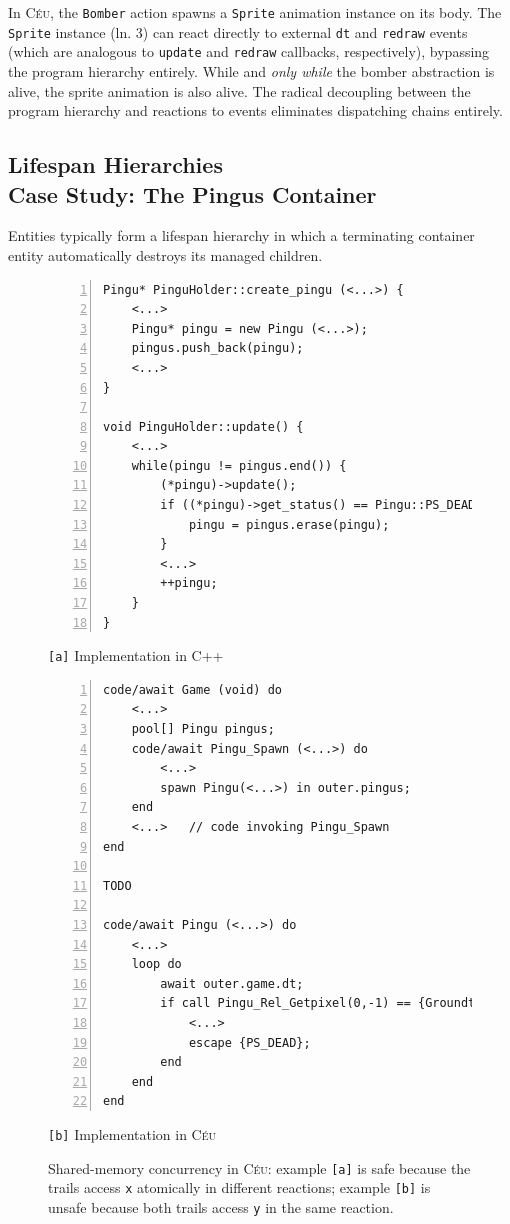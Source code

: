 \documentclass{vgtc}                          %
\newcommand{\CEU}{\textsc{C\'{e}u}\xspace}
\newcommand{\code}[1] {{\small{\texttt{#1}}}}
\newcommand{\ax}{\code{[a]}\xspace}
\newcommand{\bx}{\code{[b]}\xspace}
\begin{document}
In \CEU, the \code{Bomber} action spawns a \code{Sprite} animation instance on
its body.
%
The \code{Sprite} instance (ln. 3) can react directly to external \code{dt} and
\code{redraw} events (which are analogous to \code{update} and \code{redraw}
callbacks, respectively), bypassing the program hierarchy entirely.
While and \emph{only while} the bomber abstraction is alive, the sprite
animation is also alive.
The radical decoupling between the program hierarchy and reactions to events
eliminates dispatching chains entirely.

\subsection{Lifespan Hierarchies \\ Case Study: The Pingus Container}

Entities typically form a lifespan hierarchy in which a terminating
container entity automatically destroys its managed children.

\begin{figure}
\begin{minipage}[t]{0.50\linewidth}
\begin{lstlisting}[numbers=left,xleftmargin=3em]
Pingu* PinguHolder::create_pingu (<...>) {
    <...>
    Pingu* pingu = new Pingu (<...>);
    pingus.push_back(pingu);
    <...>
}

void PinguHolder::update() {
    <...>
    while(pingu != pingus.end()) {
        (*pingu)->update();
        if ((*pingu)->get_status() == Pingu::PS_DEAD) {
            pingu = pingus.erase(pingu);
        }
        <...>
        ++pingu;
    }
}
\end{lstlisting}
\centering\small{\ax Implementation in C++}
\end{minipage}
%
\begin{minipage}[t]{0.40\linewidth}
\begin{lstlisting}[numbers=left,xleftmargin=3em]
code/await Game (void) do
    <...>
    pool[] Pingu pingus;
    code/await Pingu_Spawn (<...>) do
        <...>
        spawn Pingu(<...>) in outer.pingus;
    end
    <...>   // code invoking Pingu_Spawn
end

TODO

code/await Pingu (<...>) do
    <...>
    loop do
        await outer.game.dt;
        if call Pingu_Rel_Getpixel(0,-1) == {Groundtype::GP_OUTOFSCREEN} then
            <...>
            escape {PS_DEAD};
        end
    end
end
\end{lstlisting}
\centering\small{\bx Implementation in \CEU}
\end{minipage}
\caption{ Shared-memory concurrency in \CEU:
example \ax is safe because the trails access \code{x} atomically in different 
reactions;
example \bx is unsafe because both trails access \code{y} in the same reaction.
\label{lst.shared}
}
\end{figure}
\end{document}
